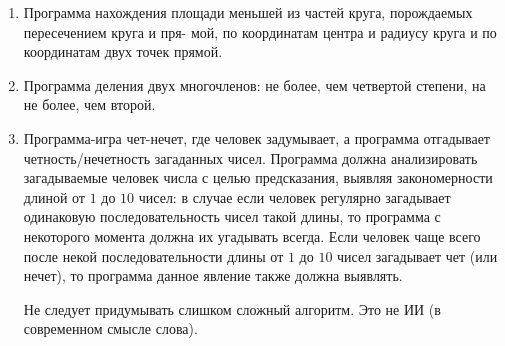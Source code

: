 \begin{enumerate}
\item[10] 
Программа нахождения площади меньшей из частей круга, 
порождаемых пересечением круга и пря-
мой, по координатам центра и радиусу круга и по координатам двух точек прямой.

\item[11] Программа деления двух многочленов: 
не более, чем четвертой степени, на не более, чем второй.

\item[12] Программа-игра чет-нечет, где человек задумывает, 
а программа отгадывает четность/нечетность
загаданных чисел. Программа должна анализировать загадываемые человек 
числа с целью предсказания, выявляя закономерности длиной от 
$1$ до $10$ чисел: в случае если человек регулярно загадывает
одинаковую последовательность чисел такой длины, то программа с 
некоторого момента должна их
угадывать всегда. Если человек чаще всего после некой 
последовательности длины от $1$ до $10$ чисел
загадывает чет (или нечет), то программа данное явление также должна выявлять.

Не следует придумывать слишком сложный алгоритм. Это не ИИ (в современном смысле слова).


\end{enumerate}
